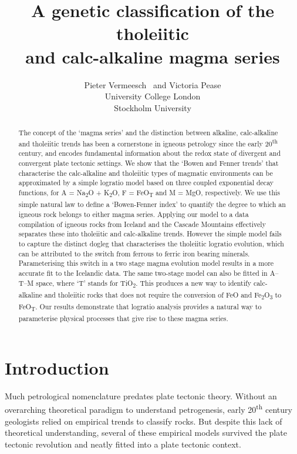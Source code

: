 \documentclass{article}
\title{A genetic classification of the tholeiitic\\
  and calc-alkaline magma series}
\author{Pieter Vermeesch\footnotemark[1]~ and Victoria Pease\footnotemark[2]\\
  \footnotemark[1] University College London\\
  \footnotemark[2] Stockholm University
}
\begin{document}
\linenumbers
\maketitle

\begin{abstract}
  The concept of the `magma series' and the distinction between
  alkaline, calc-alkaline and tholeiitic trends has been a cornerstone
  in igneous petrology since the early 20\textsuperscript{th} century,
  and encodes fundamental information about the redox state of
  divergent and convergent plate tectonic settings. We show that the
  `Bowen and Fenner trends' that characterise the calc-alkaline and
  tholeiitic types of magmatic environments can be approximated by a
  simple logratio model based on three coupled exponential decay
  functions, for A = Na\textsubscript{2}O + K\textsubscript{2}O, F =
  FeO\textsubscript{T} and M = MgO, respectively.  We use this simple
  natural law to define a `Bowen-Fenner index' to quantify the degree
  to which an igneous rock belongs to either magma series.  Applying
  our model to a data compilation of igneous rocks from Iceland and
  the Cascade Mountains effectively separates these into tholeiitic
  and calc-alkaline trends.  However the simple model fails to capture
  the distinct dogleg that characterises the tholeiitic logratio
  evolution, which can be attributed to the switch from ferrous to
  ferric iron bearing minerals.  Parameterising this switch in a two
  stage magma evolution model results in a more accurate fit to the
  Icelandic data. The same two-stage model can also be fitted in
  A--T--M space, where `T' stands for TiO\textsubscript{2}. This
  produces a new way to identify calc-alkaline and tholeiitic rocks
  that does not require the conversion of FeO and
  Fe\textsubscript{2}O\textsubscript{3} to FeO\textsubscript{T}. Our
  results demonstrate that logratio analysis provides a natural way to
  parameterise physical processes that give rise to these magma
  series.
\end{abstract}

\section{Introduction}

Much petrological nomenclature predates plate tectonic theory.
Without an overarching theoretical paradigm to understand
petrogenesis, early 20\textsuperscript{th} century geologists relied
on empirical trends to classify rocks. But despite this lack of
theoretical understanding, several of these empirical models survived
the plate tectonic revolution and neatly fitted into a plate tectonic
context.\medskip
\end{document}
